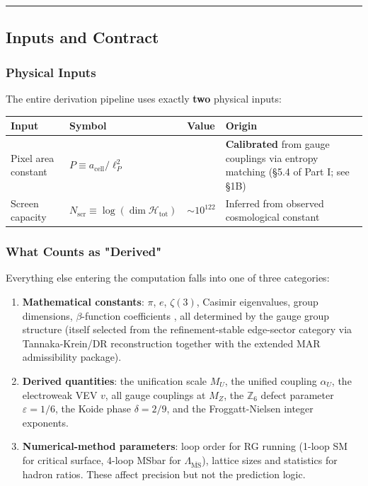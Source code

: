 \begin{center}\rule{0.5\linewidth}{0.5pt}\end{center}

\subsection{Inputs and Contract}\label{1-inputs-and-contract}

\subsubsection{Physical Inputs}\label{11-physical-inputs}

The entire derivation pipeline uses exactly \textbf{two} physical inputs:

{\def\LTcaptype{none} %
\begin{longtable}[]{@{}>{\RaggedRight\arraybackslash}p{}>{\RaggedRight\arraybackslash}p{}>{\RaggedRight\arraybackslash}p{}>{\RaggedRight\arraybackslash}p{}@{}}
\toprule\noalign{}
Input & Symbol & Value & Origin \\
\midrule\noalign{}
\endhead
\bottomrule\noalign{}
\endlastfoot
Pixel area constant & \(P \equiv a_{\text{cell}}/\ell_P^2\) & 1.63094 & \textbf{Calibrated} from gauge couplings via entropy matching (\S{}5.4 of Part I; see \S{}1B) \\
Screen capacity & \(N_{\mathrm{scr}} \equiv \log(\dim\mathcal{H}_{\text{tot}})\) & \(\sim 10^{122}\) & Inferred from observed cosmological constant \\
\end{longtable}
}

\subsubsection{What Counts as "Derived"}\label{12-what-counts-as-derived}

Everything else entering the computation falls into one of three categories:

\begin{enumerate}
\def\labelenumi{\arabic{enumi}.}
\item
  \textbf{Mathematical constants}: \(\pi\), \(e\), \(\zeta(3)\), Casimir eigenvalues, group dimensions, \(\beta\)-function coefficients , all determined by the gauge group structure (itself selected from the refinement-stable edge-sector category via Tannaka-Krein/DR reconstruction together with the extended MAR admissibility package).
\item
  \textbf{Derived quantities}: the unification scale \(M_U\), the unified coupling \(\alpha_U\), the electroweak VEV \(v\), all gauge couplings at \(M_Z\), the \(\mathbb{Z}_6\) defect parameter \(\varepsilon = 1/6\), the Koide phase \(\delta = 2/9\), and the Froggatt-Nielsen integer exponents.
\item
  \textbf{Numerical-method parameters}: loop order for RG running (1-loop SM for critical surface, 4-loop MSbar for \(\Lambda_{\overline{\text{MS}}}\)), lattice sizes and statistics for hadron ratios. These affect precision but not the prediction logic.
\end{enumerate}

